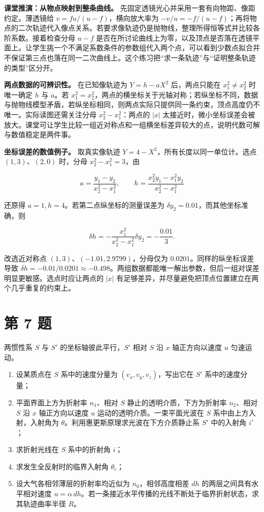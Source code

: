 \documentclass[12pt,a4paper,UTF8]{ctexart}
\newcommand{\tightlist}{\setlength{\itemsep}{0pt}\setlength{\parskip}{0pt}}
\begin{document}
\textbf{课堂推演：从物点映射到整条曲线。}
先固定透镜光心并采用一套有向物距、像距约定。薄透镜给
\(v=fu/(u-f)\)，横向放大率为
\(-v/u=-f/(u-f)\)；再将物点的二次轨迹代入像点关系。若要求像轨迹仍是抛物线，整理所得恒等式并比较各阶系数。接着检查分母
\(u-f\)
是否在所讨论曲线上为零，以及顶点是否落在透镜平面上。让学生挑一个不满足系数条件的参数组代入两个点，可以看到少数点拟合并不保证第三点也落在同一二次曲线上。这个练习把``求一条轨迹''与``证明整条轨迹的类型''区分开。

\textbf{两点数据的可辨识性。} 在已知像轨迹为 \(Y=h-aX^2\) 后，两点只能在
\(x_1^2\ne x_2^2\) 时唯一确定 \(h\) 与 \(a\)。若
\(x_1^2=x_2^2\)，两点的横坐标关于光轴对称；若纵坐标不同，数据与抛物线模型矛盾，若纵坐标相同，则两点实际只提供同一条约束，顶点高度仍不唯一。实际读图还需关注分母
\(x_2^2-x_1^2\)：两点的 \(|x|\)
太接近时，微小坐标误差会被放大。课堂可让学生比较一组近对称点和一组横坐标差异较大的点，说明代数可解与数值稳定是两件事。

\textbf{坐标误差的数值例子。} 取真实像轨迹
\(Y=4-X^2\)，所有长度以同一单位计。选点 \((1,3)\)、\((2,0)\) 时，分母
\(x_2^2-x_1^2=3\)，由

\[
a=\frac{y_1-y_2}{x_2^2-x_1^2},\qquad
h=\frac{x_2^2y_1-x_1^2y_2}{x_2^2-x_1^2}
\]

还原得 \(a=1,h=4\)。若第二点纵坐标的测量误差为
\(\delta y_2=0.01\)，而其他坐标准确，则

\[
\delta h=-\frac{x_1^2}{x_2^2-x_1^2}\delta y_2=-\frac{0.01}{3}.
\]

改选近对称点 \((1,3)\)、\((-1.01,2.9799)\)，分母仅为
\(0.0201\)。同样的纵坐标误差导致
\(\delta h=-0.01/0.0201\approx-0.498\)。两组数据都能唯一解出参数，但后一组对误差明显更敏感。选点时应让两点的
\(|x|\) 有足够差异，并尽量避免把顶点位置建立在两个几乎重复的约束上。

\newpage

\section{第 7 题}\label{ux7b2c-7-ux9898}

两惯性系 \(S\) 与 \(S'\) 的坐标轴彼此平行，\(S'\) 相对 \(S\) 沿 \(x\)
轴正方向以速度 \(u\) 匀速运动。

\begin{enumerate}
\def\labelenumi{\arabic{enumi}.}
\tightlist
\item
  设某质点在 \(S\) 系中的速度分量为 \((v_x,v_y,v_z)\)，写出它在 \(S'\)
  系中的速度分量；
\item
  平面界面上方为折射率 \(n_1\)、相对 \(S\) 静止的透明介质，下方为折射率
  \(n_2\)、相对 \(S\) 沿 \(x\) 轴正方向以速度 \(u\)
  运动的透明介质。一束平面光波在 \(S\) 系中由上方入射，入射角为
  \(\theta\)。利用惠更斯原理求光波在下方介质静止系 \(S'\) 中的入射角
  \(i'\)；
\item
  求折射光线在 \(S\) 系中的折射角 \(i\)；
\item
  求发生全反射时的临界入射角 \(\theta_c\)；
\item
  设大气各相邻薄层的折射率均近似为 \(n_0\)，相邻高度相差 \(dh\)
  的两层之间具有水平相对速度
  \(u=\alpha\,dh\)。若一条接近水平传播的光线不断处于临界折射状态，求其轨迹曲率半径
  \(R\)。
\end{enumerate}
\end{document}
